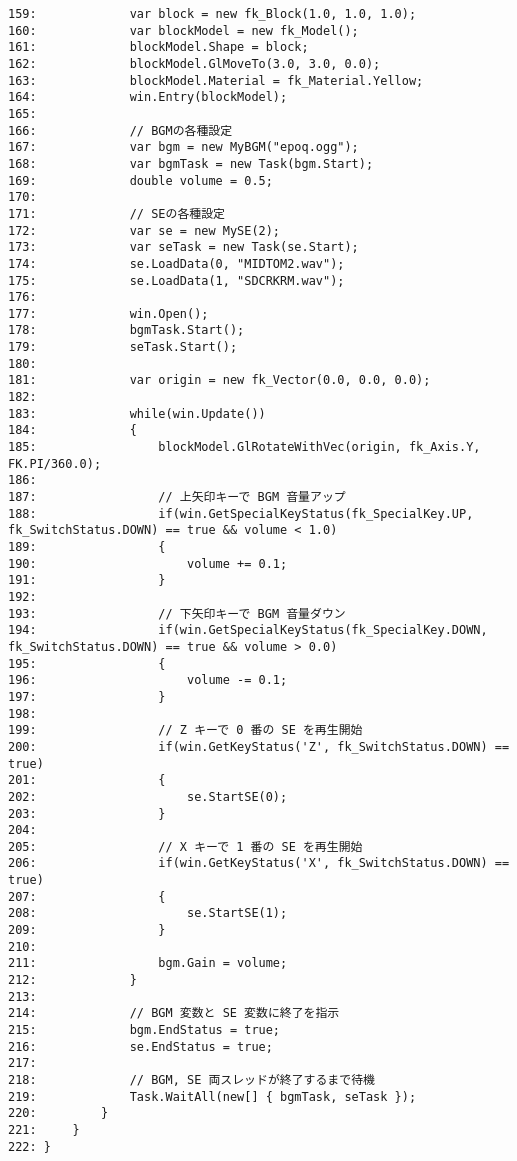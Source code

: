 \begin{breakbox}
\begin{small}
\begin{verbatim}
159:             var block = new fk_Block(1.0, 1.0, 1.0);
160:             var blockModel = new fk_Model();
161:             blockModel.Shape = block;
162:             blockModel.GlMoveTo(3.0, 3.0, 0.0);
163:             blockModel.Material = fk_Material.Yellow;
164:             win.Entry(blockModel);
165: 
166:             // BGMの各種設定
167:             var bgm = new MyBGM("epoq.ogg");
168:             var bgmTask = new Task(bgm.Start);
169:             double volume = 0.5;
170:             
171:             // SEの各種設定
172:             var se = new MySE(2);
173:             var seTask = new Task(se.Start);
174:             se.LoadData(0, "MIDTOM2.wav");
175:             se.LoadData(1, "SDCRKRM.wav");
176: 
177:             win.Open();
178:             bgmTask.Start();
179:             seTask.Start();
180: 
181:             var origin = new fk_Vector(0.0, 0.0, 0.0);
182: 
183:             while(win.Update())
184:             {
185:                 blockModel.GlRotateWithVec(origin, fk_Axis.Y, FK.PI/360.0);
186: 
187:                 // 上矢印キーで BGM 音量アップ
188:                 if(win.GetSpecialKeyStatus(fk_SpecialKey.UP, fk_SwitchStatus.DOWN) == true && volume < 1.0)
189:                 {
190:                     volume += 0.1;
191:                 }
192: 
193:                 // 下矢印キーで BGM 音量ダウン
194:                 if(win.GetSpecialKeyStatus(fk_SpecialKey.DOWN, fk_SwitchStatus.DOWN) == true && volume > 0.0)
195:                 {
196:                     volume -= 0.1;
197:                 }
198: 
199:                 // Z キーで 0 番の SE を再生開始
200:                 if(win.GetKeyStatus('Z', fk_SwitchStatus.DOWN) == true)
201:                 {
202:                     se.StartSE(0);
203:                 }
204: 
205:                 // X キーで 1 番の SE を再生開始
206:                 if(win.GetKeyStatus('X', fk_SwitchStatus.DOWN) == true)
207:                 {
208:                     se.StartSE(1);
209:                 }
210: 
211:                 bgm.Gain = volume;
212:             }
213: 
214:             // BGM 変数と SE 変数に終了を指示
215:             bgm.EndStatus = true;
216:             se.EndStatus = true;
217: 
218:             // BGM, SE 両スレッドが終了するまで待機
219:             Task.WaitAll(new[] { bgmTask, seTask });
220:         }
221:     }
222: }
\end{verbatim}
\end{small}
\end{breakbox}
